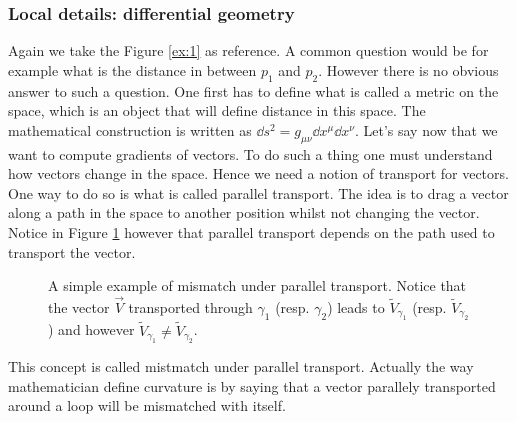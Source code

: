 \documentclass[10pt,a4paper]{book}
\begin{document}
\subsubsection{Local details: differential geometry}
Again we take the Figure \ref{ex:1} as reference. A common question would be for example what is the distance in between $p_1$ and $p_2$. However there is no obvious answer to such a question. One first has to define what is called a metric on the space, which is an object that will define distance in this space. The mathematical construction is written as $\dd s^2 = g_{\mu \nu} \dd x^\mu \dd x^\nu$. Let's say now that we want to compute gradients of vectors. To do such a thing one must understand how vectors change in the space. Hence we need a notion of transport for vectors. One way to do so is what is called parallel transport. The idea is to drag a vector along a path in the space to another position whilst not changing the vector. Notice in Figure \ref{parallel transport} however that parallel transport depends on the path used to transport the vector.
\begin{figure}[h] \label{parallel transport}
\centering
{}
\caption{A simple example of mismatch under parallel transport. Notice that the vector $\vec{V}$ transported through $\gamma_1$ (resp. $\gamma_2$) leads to $\tilde{V}_{\gamma_1}$ (resp.  $\tilde{V}_{\gamma_2}$) and however $\tilde{V}_{\gamma_1} \neq  \tilde{V}_{\gamma_2}$.}
\end{figure}
This concept is called mistmatch under parallel transport. Actually the way mathematician define curvature is by saying that a vector parallely transported around a loop will be mismatched with itself.
\end{document}
